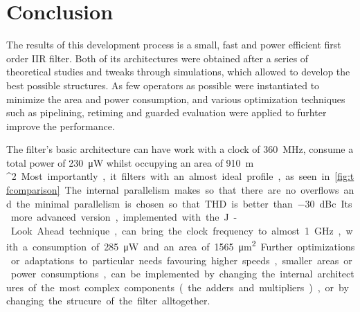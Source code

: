 \chapter{Conclusion}
The results of this development process is a small, fast and power efficient first order IIR filter. Both of its architectures were obtained after a series of theoretical studies and tweaks through simulations, which allowed to develop the best possible structures. As few operators as possible were instantiated to minimize the area and power consumption, and various optimization techniques such as pipelining, retiming and guarded evaluation were applied to furhter improve the performance.

The filter's basic architecture can have work with a clock of \SI{360}{MHz}, consume a total power of \SI{230}{\micro W} whilst occupying an area of \SI{910}{\micro m ^2}. Most importantly, it filters with an almost ideal profile, as seen in \autoref{fig:tfcomparison}. The internal parallelism makes so that there are no overflows and the minimal parallelism is chosen so that THD is better than \SI{-30}{dBc}.

Its more advanced version, implemented with the J-Look Ahead technique, can bring the clock frequency to almost \SI{1}{GHz}, with a consumption of \SI{285}{\micro W} and an area of \SI{1565}{\micro m^2}.

Further optimizations or adaptations to particular needs favouring higher speeds, smaller areas or power consumptions, can be implemented by changing the internal architectures of the most complex components (the adders and multipliers), or by changing the strucure of the filter alltogether. 
